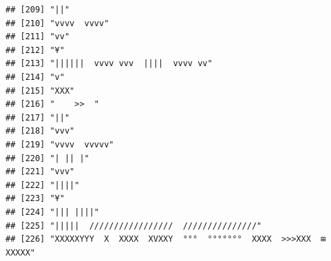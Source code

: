 \documentclass[
]{article}
\begin{document}
\begin{verbatim}
## [209] "||"                                                                                                                                       
## [210] "vvvv  vvvv"                                                                                                                               
## [211] "vv"                                                                                                                                       
## [212] "¥"                                                                                                                                        
## [213] "||||||  vvvv vvv  ||||  vvvv vv"                                                                                                          
## [214] "v"                                                                                                                                        
## [215] "XXX"                                                                                                                                      
## [216] "    >>  "                                                                                                                                 
## [217] "||"                                                                                                                                       
## [218] "vvv"                                                                                                                                      
## [219] "vvvv  vvvvv"                                                                                                                              
## [220] "| || |"                                                                                                                                   
## [221] "vvv"                                                                                                                                      
## [222] "||||"                                                                                                                                     
## [223] "¥"                                                                                                                                        
## [224] "||| ||||"                                                                                                                                 
## [225] "|||||  /////////////////  ///////////////"                                                                                                
## [226] "XXXXXYYY  X  XXXX  XVXXY  °°°  °°°°°°°  XXXX  >>>XXX  ⊞  XXXXX"                                                                           

\end{verbatim}
\end{document}
